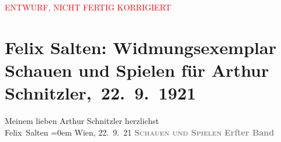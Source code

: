 
\begin{center}
            \textcolor{red}{ENTWURF, NICHT FERTIG KORRIGIERT}
                      \end{center}
            
         \renewcommand{\erwaehnteInstitutionen}{Institutionen: Wiener Literarische Anstalt}
         \renewcommand{\erwaehnteOrte}{Orte: Leipzig, Wien}
         \renewcommand{\erwaehnteWerke}{Werke: Schauen und Spielen. Studien zur Kritik des modernen Theaters, Schauen und Spielen. Studien zur Kritik des modernen Theaters. Erster Band. Ergebnisse Erlebnisse}
               \section[ Felix Salten: Widmungsexemplar Schauen und Spielen für Arthur Schnitzler, 22. 9. 1921]{ Felix Salten: Widmungsexemplar Schauen und Spielen für Arthur
               Schnitzler, 22. 9. 1921}\nopagebreak{}\rehead{ }\begin{ledgroupsized}[t]{13cm}\normalsize\beginnumbering \toendnotes[C]{\smallbreak\pagebreak[2]} 
\pstart
           \noindent{}{\pb}Meinem lieben Arthur Schnitzler\pend
           \pstart
           herzlichst {\\[\baselineskip]}\spacefill\mbox{Felix Salten}\pend
           \leftskip=0em{}\pstart
           Wien, 22. 9. 21\pend
           {\bigskip}\pstart
           \noindent{}\centering{}\textcolor{gray}{\textbf{}}\pend
           \pstart
           \noindent{}\centering{}\textcolor{gray}{\textbf{\textsc{\textbf{Schauen und Spielen}}}}\pend
           \pstart
           \noindent{}\centering{}\textcolor{gray}{\textbf{Erſter Band}}\pend
           \pstart
           \noindent{}\centering{}\textcolor{gray}{\textbf{}}
\end{ledgroupsized}
